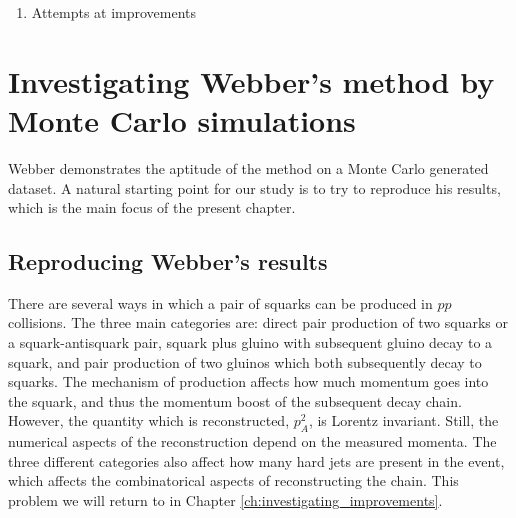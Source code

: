 \documentclass[twoside,english]{uiofysmaster}
\begin{document}
\begin{enumerate}
  \item{Attempts at improvements}
\end{enumerate}






























\chapter{Investigating Webber's method by Monte Carlo simulations}
\label{ch:MC}
Webber demonstrates the aptitude of the method on a Monte Carlo generated dataset. A natural starting point for our study is to try to reproduce his results, which is the main focus of the present chapter. 

\section{Reproducing Webber's results}
There are several ways in which a pair of squarks can be produced in $pp$ collisions. The three main categories are: direct pair production of two squarks or a squark-antisquark pair, squark plus gluino with subsequent gluino decay to a squark, and pair production of two gluinos which both subsequently decay to squarks. The mechanism of production affects how much momentum goes into the squark, and thus the momentum boost of the subsequent decay chain. However, the quantity which is reconstructed, $p_A^2$, is Lorentz invariant. Still, the numerical aspects of the reconstruction depend on the measured momenta. The three different categories also affect how many hard jets are present in the event, which affects the combinatorical aspects of reconstructing the chain. This problem we will return to in Chapter \ref{ch:investigating_improvements}.
\end{document}
